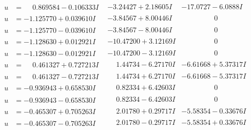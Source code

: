 \documentclass[1p]{elsarticle_modified}
\theoremstyle{definition}
\begin{document}
$$\begin{array}{c|c|c}
 \hline 
\begin{aligned}
u &= \phantom{-}0.869584 - 0.106333 I\end{aligned}
 & -3.24427 + 2.18605 I & -17.0727 - 6.0888 I \\ \hline\begin{aligned}
u &= -1.125770 + 0.039610 I\end{aligned}
 & -3.84567 + 8.00446 I & \phantom{-0.000000 } 0 \\ \hline\begin{aligned}
u &= -1.125770 - 0.039610 I\end{aligned}
 & -3.84567 - 8.00446 I & \phantom{-0.000000 } 0 \\ \hline\begin{aligned}
u &= -1.128630 + 0.012921 I\end{aligned}
 & -10.47200 + 3.12169 I & \phantom{-0.000000 } 0 \\ \hline\begin{aligned}
u &= -1.128630 - 0.012921 I\end{aligned}
 & -10.47200 - 3.12169 I & \phantom{-0.000000 } 0 \\ \hline\begin{aligned}
u &= \phantom{-}0.461327 + 0.727213 I\end{aligned}
 & \phantom{-}1.44734 - 6.27170 I & -6.61668 + 5.37317 I \\ \hline\begin{aligned}
u &= \phantom{-}0.461327 - 0.727213 I\end{aligned}
 & \phantom{-}1.44734 + 6.27170 I & -6.61668 - 5.37317 I \\ \hline\begin{aligned}
u &= -0.936943 + 0.658530 I\end{aligned}
 & \phantom{-}0.82334 + 6.42603 I & \phantom{-0.000000 } 0 \\ \hline\begin{aligned}
u &= -0.936943 - 0.658530 I\end{aligned}
 & \phantom{-}0.82334 - 6.42603 I & \phantom{-0.000000 } 0 \\ \hline\begin{aligned}
u &= -0.465307 + 0.705263 I\end{aligned}
 & \phantom{-}2.01780 + 0.29717 I & -5.58354 - 0.33676 I \\ \hline\begin{aligned}
u &= -0.465307 - 0.705263 I\end{aligned}
 & \phantom{-}2.01780 - 0.29717 I & -5.58354 + 0.33676 I \\ \hline\begin{aligned}

\end{aligned}
\end{array}$$
\end{document}
